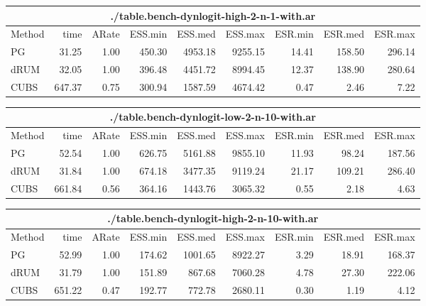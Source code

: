 \documentclass[11pt]{article}
\begin{document}
\begin{table}
\begin{tabular}{l r r r r r r r r } 
\hline
\multicolumn{9}{c}{./table.bench-dynlogit-high-2-n-1-with.ar} \\
\hline
          Method  &     time &    ARate &  ESS.min &  ESS.med &  ESS.max &  ESR.min &  ESR.med &  ESR.max \\ 
              PG  &    31.25 &     1.00 &   450.30 &  4953.18 &  9255.15 &    14.41 &   158.50 &   296.14 \\ 
            dRUM  &    32.05 &     1.00 &   396.48 &  4451.72 &  8994.45 &    12.37 &   138.90 &   280.64 \\ 
            CUBS  &   647.37 &     0.75 &   300.94 &  1587.59 &  4674.42 &     0.47 &     2.46 &     7.22
 \end{tabular}

\begin{tabular}{l r r r r r r r r } 
\hline
\multicolumn{9}{c}{./table.bench-dynlogit-low-2-n-10-with.ar} \\
\hline
          Method  &     time &    ARate &  ESS.min &  ESS.med &  ESS.max &  ESR.min &  ESR.med &  ESR.max \\ 
              PG  &    52.54 &     1.00 &   626.75 &  5161.88 &  9855.10 &    11.93 &    98.24 &   187.56 \\ 
            dRUM  &    31.84 &     1.00 &   674.18 &  3477.35 &  9119.24 &    21.17 &   109.21 &   286.40 \\ 
            CUBS  &   661.84 &     0.56 &   364.16 &  1443.76 &  3065.32 &     0.55 &     2.18 &     4.63
 \end{tabular}

\begin{tabular}{l r r r r r r r r } 
\hline
\multicolumn{9}{c}{./table.bench-dynlogit-high-2-n-10-with.ar} \\
\hline
          Method  &     time &    ARate &  ESS.min &  ESS.med &  ESS.max &  ESR.min &  ESR.med &  ESR.max \\ 
              PG  &    52.99 &     1.00 &   174.62 &  1001.65 &  8922.27 &     3.29 &    18.91 &   168.37 \\ 
            dRUM  &    31.79 &     1.00 &   151.89 &   867.68 &  7060.28 &     4.78 &    27.30 &   222.06 \\ 
            CUBS  &   651.22 &     0.47 &   192.77 &   772.78 &  2680.11 &     0.30 &     1.19 &     4.12
 \end{tabular}
\end{table}

\newpage
\end{document}
